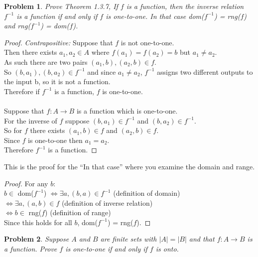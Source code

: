 \documentclass{article}
\theoremstyle{plain}
\newtheorem{problem}{Problem}
\begin{document}
\begin{problem}
    Prove Theorem 1.3.7, If $f$ is a function, then the inverse relation $f^{-1}$ is a function if and only if $f$ is one-to-one. In that case dom($f^{-1}$) = rng($f$) and rng($f^{-1}$) = dom($f$).
\end{problem}

\begin{proof}
    \textit{Contrapositive:} Suppose that $f$ is not one-to-one.\\
    Then there exists $a_1, a_2 \in A$ where $f(a_1) = f(a_2) = b$ but $a_1 \neq a_2$.\\
    As such there are two pairs $(a_1, b), (a_2, b) \in f$.\\
    So $(b, a_1), (b, a_2) \in f^{-1}$ and since $a_1 \neq a_2$, $f^{-1}$ assigns two different outputs to the input b, so it is not a function.\\
    Therefore if $f^{-1}$ is a function, $f$ is one-to-one.\\
    \smallskip\\
    Suppose that $f: A \rightarrow B$ is a function which is one-to-one.\\
    For the inverse of $f$ suppose $(b, a_1) \in f^{-1}$ and $(b, a_2) \in f^{-1}$.\\
    So for $f$ there exists $(a_1, b) \in f$ and $(a_2, b) \in f$.\\
    Since $f$ is one-to-one then $a_1 = a_2$.\\
    Therefore $f^{-1}$ is a function.
\end{proof}

This is the proof for the ``In that case'' where you examine the domain and range.

\begin{proof}
For any $b$: \\
$b \in$ dom($f^{-1}$) $\iff \exists a, (b,a) \in f^{-1}$ \quad (definition of domain) \\
$\iff \exists a, (a,b) \in f$ \quad (definition of inverse relation) \\
$\iff b \in$ rng($f$) \quad (definition of range) \\
Since this holds for all $b$, dom($f^{-1}$) = rng($f$).
\end{proof}

\setcounter{problem}{9}
\begin{problem}
    Suppose $A$ and $B$ are finite sets with $|A| = |B|$ and that $f: A \rightarrow B$ is a function. Prove $f$ is one-to-one if and only if $f$ is onto.
\end{problem}
\end{document}
